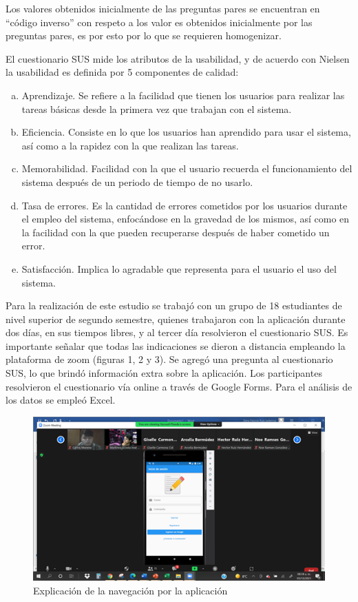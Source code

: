 \documentclass{article}
\begin{document}
Los valores obtenidos inicialmente de las preguntas pares se encuentran en “código inverso” 
con respeto a los valor	es obtenidos inicialmente por las preguntas pares, es por esto por 
lo que se requieren homogenizar. 

El cuestionario SUS mide los atributos de la usabilidad, y de acuerdo con Nielsen \cite{nielsen1994usability}
la usabilidad es definida por 5 componentes de calidad: 

\begin{enumerate}[a)] %
\item Aprendizaje. Se refiere a la facilidad que tienen los usuarios para realizar las 
tareas básicas desde la primera vez que trabajan con el sistema. 
\item Eficiencia. Consiste en lo que los usuarios han aprendido para usar el sistema, 
así como a la rapidez con la que realizan las tareas. 
\item Memorabilidad. Facilidad con la que el usuario recuerda el funcionamiento del 
sistema después de un periodo de tiempo de no usarlo.
\item Tasa de errores. Es la cantidad de errores cometidos por los usuarios durante 
el empleo del sistema, enfocándose en la gravedad de los mismos, así como en la 
facilidad con la que pueden recuperarse después de haber cometido un error.
\item Satisfacción. Implica lo agradable que representa para el usuario el uso del 
sistema.
\end{enumerate}

Para la realización de este estudio se trabajó con un grupo de 18 estudiantes de nivel 
superior de segundo semestre, quienes trabajaron con la aplicación durante dos días, 
en sus tiempos libres, y al tercer día resolvieron el cuestionario SUS. Es importante 
señalar que todas las indicaciones se dieron a distancia empleando la plataforma de 
zoom (figuras 1, 2 y 3). Se agregó una pregunta al cuestionario SUS, lo que brindó 
información extra sobre la aplicación. Los participantes resolvieron el cuestionario 
vía online a través de Google Forms. Para el análisis de los datos se empleó Excel. 


\begin{figure}[H]
    \centering
    \includegraphics[scale=0.7]{imgs/pruebas/pruebas_01.png}
    \caption{Explicación de la navegación por la aplicación}
\end{figure}
\end{document}
